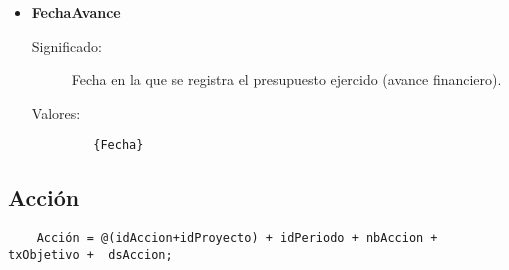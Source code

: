 \begin{itemize}
\item \textbf{FechaAvance}
      \begin{description}
        \item [Significado:] Fecha en la que se registra el presupuesto ejercido (avance financiero).
        \item [Valores:]{\begin{lstlisting}
   {Fecha}
\end{lstlisting}}\end{description}

\end{itemize}


\subsection{Acción}
\label{dd:accion}
\begin{lstlisting}
	Acción = @(idAccion+idProyecto) + idPeriodo + nbAccion + txObjetivo +  dsAccion;
  
\end{lstlisting}
